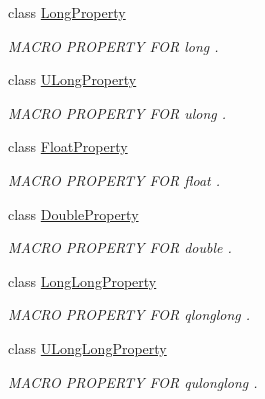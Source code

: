 \begin{DoxyCompactItemize}
class \hyperlink{class_long_property}{Long\-Property}
\begin{DoxyCompactList}\small\item\em M\-A\-C\-R\-O P\-R\-O\-P\-E\-R\-T\-Y F\-O\-R long . \end{DoxyCompactList}\item 
class \hyperlink{class_u_long_property}{U\-Long\-Property}
\begin{DoxyCompactList}\small\item\em M\-A\-C\-R\-O P\-R\-O\-P\-E\-R\-T\-Y F\-O\-R ulong . \end{DoxyCompactList}\item 
class \hyperlink{class_float_property}{Float\-Property}
\begin{DoxyCompactList}\small\item\em M\-A\-C\-R\-O P\-R\-O\-P\-E\-R\-T\-Y F\-O\-R float . \end{DoxyCompactList}\item 
class \hyperlink{class_double_property}{Double\-Property}
\begin{DoxyCompactList}\small\item\em M\-A\-C\-R\-O P\-R\-O\-P\-E\-R\-T\-Y F\-O\-R double . \end{DoxyCompactList}\item 
class \hyperlink{class_long_long_property}{Long\-Long\-Property}
\begin{DoxyCompactList}\small\item\em M\-A\-C\-R\-O P\-R\-O\-P\-E\-R\-T\-Y F\-O\-R qlonglong . \end{DoxyCompactList}\item 
class \hyperlink{class_u_long_long_property}{U\-Long\-Long\-Property}
\begin{DoxyCompactList}\small\item\em M\-A\-C\-R\-O P\-R\-O\-P\-E\-R\-T\-Y F\-O\-R qulonglong . \end{DoxyCompactList}\end{DoxyCompactItemize}
